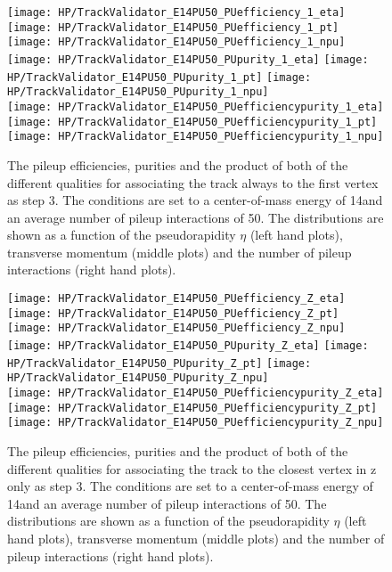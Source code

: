 \begin{figure}[!h]
  \centering
  \texttt{[image: HP/TrackValidator\_E14PU50\_PUefficiency\_1\_eta]}
  \texttt{[image: HP/TrackValidator\_E14PU50\_PUefficiency\_1\_pt]}
  \texttt{[image: HP/TrackValidator\_E14PU50\_PUefficiency\_1\_npu]}
   \\
  \texttt{[image: HP/TrackValidator\_E14PU50\_PUpurity\_1\_eta]}
  \texttt{[image: HP/TrackValidator\_E14PU50\_PUpurity\_1\_pt]}
  \texttt{[image: HP/TrackValidator\_E14PU50\_PUpurity\_1\_npu]}
   \\
  \texttt{[image: HP/TrackValidator\_E14PU50\_PUefficiencypurity\_1\_eta]}
  \texttt{[image: HP/TrackValidator\_E14PU50\_PUefficiencypurity\_1\_pt]}
  \texttt{[image: HP/TrackValidator\_E14PU50\_PUefficiencypurity\_1\_npu]}
  \caption[Pileup efficiencies, purities and their product of the different qualities of the association map with associating to the first vertex always as step 3 with 14\TeV and PU=50]{The pileup efficiencies, purities and the product of both of the different qualities for associating the track always to the first vertex as step 3. The conditions are set to a center-of-mass energy of 14\TeV and an average number of pileup interactions of 50. The distributions are shown as a function of the pseudorapidity $\eta$ (left hand plots), transverse momentum (middle plots) and the number of pileup interactions (right hand plots).}
\end{figure}
\clearpage

\begin{figure}[!h]
  \centering
  \texttt{[image: HP/TrackValidator\_E14PU50\_PUefficiency\_Z\_eta]}
  \texttt{[image: HP/TrackValidator\_E14PU50\_PUefficiency\_Z\_pt]}
  \texttt{[image: HP/TrackValidator\_E14PU50\_PUefficiency\_Z\_npu]}
   \\
  \texttt{[image: HP/TrackValidator\_E14PU50\_PUpurity\_Z\_eta]}
  \texttt{[image: HP/TrackValidator\_E14PU50\_PUpurity\_Z\_pt]}
  \texttt{[image: HP/TrackValidator\_E14PU50\_PUpurity\_Z\_npu]}
   \\
  \texttt{[image: HP/TrackValidator\_E14PU50\_PUefficiencypurity\_Z\_eta]}
  \texttt{[image: HP/TrackValidator\_E14PU50\_PUefficiencypurity\_Z\_pt]}
  \texttt{[image: HP/TrackValidator\_E14PU50\_PUefficiencypurity\_Z\_npu]}
  \caption[Pileup efficiencies, purities and their product of the different qualities of the association map with associating to the closest vertex in z only as step 3 with 14\TeV and PU=50]{The pileup efficiencies, purities and the product of both of the different qualities for associating the track to the closest vertex in z only as step 3. The conditions are set to a center-of-mass energy of 14\TeV and an average number of pileup interactions of 50. The distributions are shown as a function of the pseudorapidity $\eta$ (left hand plots), transverse momentum (middle plots) and the number of pileup interactions (right hand plots).}
\end{figure}
\clearpage

